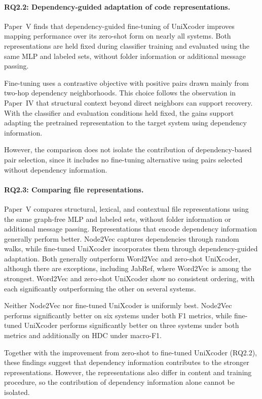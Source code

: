 \paragraph{RQ2.2: Dependency-guided adaptation of code representations.} Paper~V finds that dependency-guided fine-tuning of UniXcoder improves mapping performance over its zero-shot form on nearly all systems. Both representations are held fixed during classifier training and evaluated using the same MLP and labeled sets, without folder information or additional message passing.

Fine-tuning uses a contrastive objective with positive pairs drawn mainly from two-hop dependency neighborhoods. This choice follows the observation in Paper~IV that structural context beyond direct neighbors can support recovery. With the classifier and evaluation conditions held fixed, the gains support adapting the pretrained representation to the target system using dependency information.

However, the comparison does not isolate the contribution of dependency-based pair selection, since it includes no fine-tuning alternative using pairs selected without dependency information.

\paragraph{RQ2.3: Comparing file representations.} Paper~V compares structural, lexical, and contextual file representations using the same graph-free MLP and labeled sets, without folder information or additional message passing. Representations that encode dependency information generally perform better. Node2Vec captures dependencies through random walks, while fine-tuned UniXcoder incorporates them through dependency-guided adaptation. Both generally outperform Word2Vec and zero-shot UniXcoder, although there are exceptions, including JabRef, where Word2Vec is among the strongest. Word2Vec and zero-shot UniXcoder show no consistent ordering, with each significantly outperforming the other on several systems.

Neither Node2Vec nor fine-tuned UniXcoder is uniformly best. Node2Vec performs significantly better on six systems under both F1 metrics, while fine-tuned UniXcoder performs significantly better on three systems under both metrics and additionally on HDC under macro-F1.

Together with the improvement from zero-shot to fine-tuned UniXcoder (RQ2.2), these findings suggest that dependency information contributes to the stronger representations. However, the representations also differ in content and training procedure, so the contribution of dependency information alone cannot be isolated.

